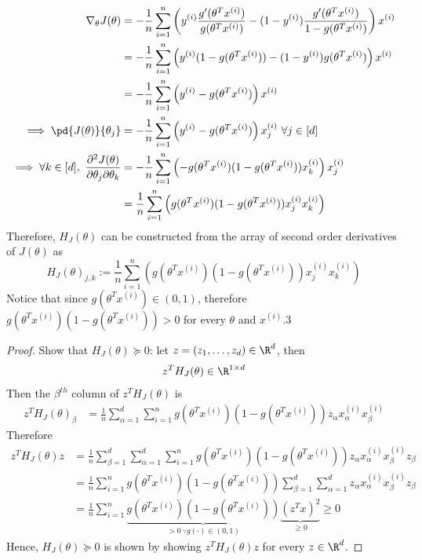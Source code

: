 \documentclass[11pt]{article}
\newcommand{\upi}[0]{^{(i)}}
\begin{document}
	\begin{align}
		\nabla_\theta J(\theta) &= - \frac{1}{n} \sum_{i=1}^n \left(
		y\upi \frac{g'(\theta^T x\upi)}{g(\theta^T x\upi)}
		- (1 - y\upi) \frac{g'(\theta^T x\upi)}{1-g(\theta^T x\upi)}
		\right) x\upi \\
		&= - \frac{1}{n} \sum_{i=1}^n \left(
		y\upi (1 - g(\theta^T x\upi)) - (1 - y\upi) g(\theta^T x\upi)
		\right) x\upi \\
		&= - \frac{1}{n} \sum_{i=1}^n \left(
		y\upi - g(\theta^T x\upi)
		\right ) x\upi \\
		\implies \pd{J(\theta)}{\theta_j} &= - \frac{1}{n} \sum_{i=1}^n \left(
		y\upi - g(\theta^T x\upi)
		\right ) x\upi_j\ \forall j \in [d]\\
		\implies \forall k \in [d],\ \frac{\partial^2 J(\theta)}{\partial \theta_j \partial \theta_k} &= -\frac{1}{n}\sum_{i=1}^n \left (
		- g(\theta^T x\upi) (1-g(\theta^T x\upi)) x\upi_k
		\right) x\upi_j \\
		&= \frac{1}{n}\sum_{i=1}^n \left (
		g(\theta^T x\upi) (1-g(\theta^T x\upi)) x\upi_j x\upi_k
		\right)
	\end{align}
	Therefore, $H_J (\theta)$ can be constructed from the array of second order derivatives of $J(\theta)$ as 
	\begin{equation}
		H_J(\theta)_{j, k} := \frac{1}{n}\sum_{i=1}^n \left (
		g(\theta^T x\upi) (1-g(\theta^T x\upi)) x\upi_j x\upi_k
		\right)
	\end{equation}
	Notice that since $g(\theta^T x\upi) \in (0, 1)$, therefore $g(\theta^T x\upi) (1-g(\theta^T x\upi)) > 0$ for every $\theta$ and $x\upi$.3
	\begin{proof} Show that $H_J (\theta) \succeq 0$: let $z = (z_1,\dots,z_d) \in \R^d$, then
		\begin{align}
			z^T H_J (\theta) \in \R^{1 \times d}
		\end{align}
		Then the $\beta^{th}$ column of $z^T H_J (\theta)$ is
		\begin{align}
			z^T H_J (\theta)_{\beta} &= \frac{1}{n} \sum_{\alpha=1}^d \sum_{i=1}^n g(\theta^T x\upi) (1-g(\theta^T x\upi)) z_\alpha x\upi_\alpha x\upi_\beta
		\end{align}
		Therefore
		\begin{align}
			z^T H_J(\theta) z &= \frac{1}{n} \sum_{\beta=1}^d \sum_{\alpha=1}^d \sum_{i=1}^n g(\theta^T x\upi) (1-g(\theta^T x\upi)) z_\alpha x\upi_\alpha x\upi_\beta z_\beta \\
			&= \frac{1}{n} \sum_{i=1}^n g(\theta^T x\upi) (1-g(\theta^T x\upi)) \sum_{\beta=1}^d \sum_{\alpha=1}^d z_\alpha x\upi_\alpha x\upi_\beta z_\beta \\
			&= \frac{1}{n} \sum_{i=1}^n \underbrace{g(\theta^T x\upi) (1-g(\theta^T x\upi))}_{> 0\ \because g(\cdot) \in (0, 1)} \underbrace{(z^T x)^2}_{\geq 0} \geq 0
		\end{align}
		Hence, $H_J(\theta) \succeq 0$ is shown by showing $z^T H_J(\theta) z$ for every $z \in \R^d$.
	\end{proof}
	
\end{document}
